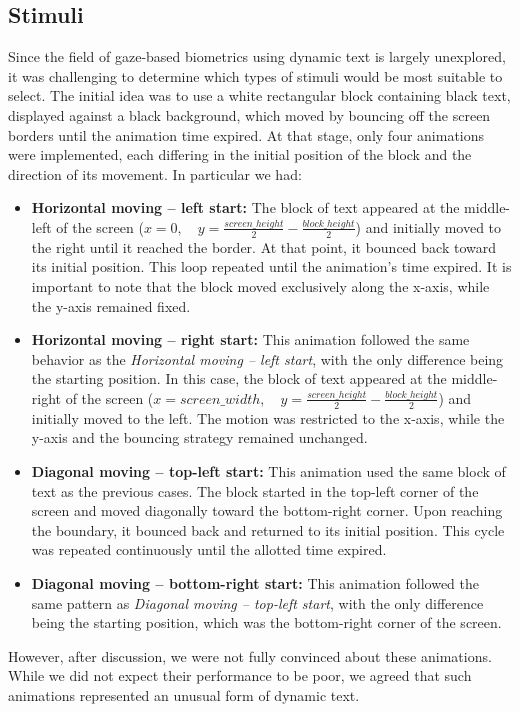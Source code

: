 \documentclass{article}
\begin{document}
\subsection{Stimuli}

Since the field of gaze-based biometrics using dynamic text is largely unexplored, it was challenging to determine which types of stimuli would be most suitable to select.
The initial idea was to use a white rectangular block containing black text, displayed against a black background, which moved by bouncing off the screen borders until the animation time expired.
At that stage, only four animations were implemented, each differing in the initial position of the block and the direction of its movement.
In particular we had:
\begin{itemize}
    \item \textbf{Horizontal moving – left start:} The block of text appeared at the middle-left of the screen (\( x = 0, \quad y = \frac{screen\_height}{2} - \frac{block\_height}{2} \)) and initially moved to the right until it reached the border. 
    At that point, it bounced back toward its initial position. 
    This loop repeated until the animation's time expired. 
    It is important to note that the block moved exclusively along the x-axis, while the y-axis remained fixed.
    \item \textbf{Horizontal moving – right start:} This animation followed the same behavior as the \textit{Horizontal moving – left start}, with the only difference being the starting position. 
    In this case, the block of text appeared at the middle-right of the screen (\( x = screen\_width, \quad y = \frac{screen\_height}{2} - \frac{block\_height}{2} \)) and initially moved to the left.
    The motion was restricted to the x-axis, while the y-axis and the bouncing strategy remained unchanged.
    \item \textbf{Diagonal moving – top-left start:} This animation used the same block of text as the previous cases. 
    The block started in the top-left corner of the screen and moved diagonally toward the bottom-right corner. 
    Upon reaching the boundary, it bounced back and returned to its initial position. 
    This cycle was repeated continuously until the allotted time expired.
    \item \textbf{Diagonal moving – bottom-right start:} This animation followed the same pattern as \textit{Diagonal moving – top-left start}, with the only difference being the starting position, which was the bottom-right corner of the screen.
\end{itemize}
However, after discussion, we were not fully convinced about these animations. 
While we did not expect their performance to be poor, we agreed that such animations represented an unusual form of dynamic text. 
\end{document}
